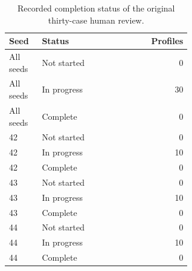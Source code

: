 \begin{table}[htbp!]
\centering
\small
\setlength{\tabcolsep}{3pt}
\renewcommand{\arraystretch}{1.1}
\begin{tabular}{p{0.18\linewidth}p{0.42\linewidth}r}
\hline
Seed & Status & Profiles \\
\hline
All seeds & Not started & 0 \\
All seeds & In progress & 30 \\
All seeds & Complete & 0 \\
42 & Not started & 0 \\
42 & In progress & 10 \\
42 & Complete & 0 \\
43 & Not started & 0 \\
43 & In progress & 10 \\
43 & Complete & 0 \\
44 & Not started & 0 \\
44 & In progress & 10 \\
44 & Complete & 0 \\
\hline
\end{tabular}
\caption{Recorded completion status of the original thirty-case human review.}
\label{chap:results:tab:rq3_profile_review_completion}
\end{table}
